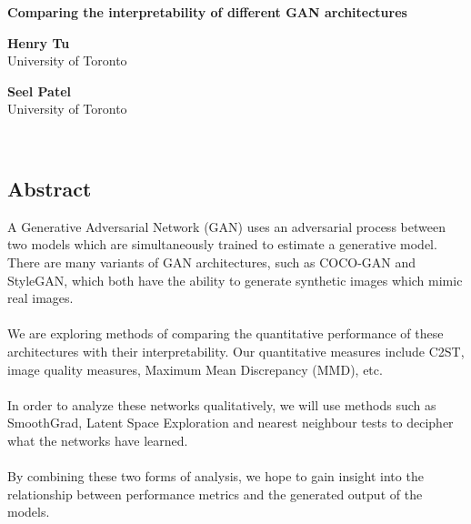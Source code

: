 \documentclass[12pt]{article}
\begin{document}
    \begin{center}
        \textbf{Comparing the interpretability of different GAN architectures}
    \end{center}
    \begin{minipage}{.5\textwidth}
        \centering
        \textbf{Henry Tu}\\
        University of Toronto
    \end{minipage}
    \begin{minipage}{.5\textwidth}
        \centering
        \textbf{Seel Patel}\\
        University of Toronto
    \end{minipage}
    \\

    \begin{multicols*}{2}
        \raggedcolumns

        \section{Abstract}
        \label{sec:abstract}
        A Generative Adversarial Network (GAN) uses an adversarial process between two models which are simultaneously trained to estimate a generative model.\cite{gan}
        There are many variants of GAN architectures, such as COCO-GAN\cite{cocogan} and StyleGAN\cite{stylegan}, which both have the ability to generate synthetic images which mimic real images.\\\\
        We are exploring methods of comparing the quantitative performance of these architectures with their interpretability.
        Our quantitative measures include C2ST\cite{evaluateGANs}, image quality measures\cite{evaluateGANs}, Maximum Mean Discrepancy (MMD)\cite{evaluateGANs}, etc.\\\\
        In order to analyze these networks qualitatively, we will use methods such as SmoothGrad\cite{smoothgrad}, Latent Space Exploration\cite{sampleGAN} and nearest neighbour tests\cite{evaluateGANs} to decipher what the networks have learned.\\\\
        By combining these two forms of analysis, we hope to gain insight into the relationship between performance metrics and the generated output of the models.


\end{multicols*}
\end{document}
